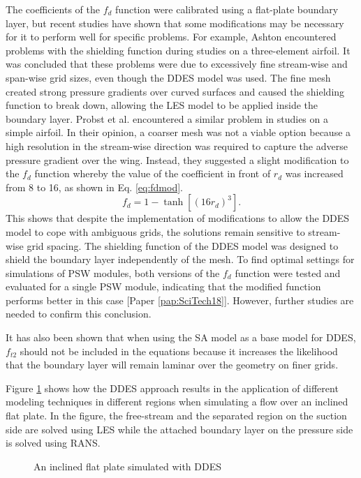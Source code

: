 The coefficients of the $f_d$ function were calibrated using a flat-plate boundary layer, but recent studies have shown that some modifications may be necessary for it to perform well for specific problems. For example, Ashton\cite{Ashton2016} encountered problems with the shielding function during studies on a three-element airfoil. It was concluded that these problems were due to excessively fine stream-wise and span-wise grid sizes, even though the DDES model was used. The fine mesh created strong pressure gradients over curved surfaces and caused the shielding function to break down, allowing the LES model to be applied inside the boundary layer. Probst et al.\cite{Probst2010} encountered a similar problem in studies on a simple airfoil. In their opinion, a coarser mesh was not a viable option because a high resolution in the stream-wise direction was required to capture the adverse pressure gradient over the wing. Instead, they suggested a slight modification to the $f_d$ function whereby the value of the coefficient in front of $r_d$ was increased from 8 to 16, as shown in Eq. \ref{eq:fdmod}. 
\begin{equation}
  f_d = 1-\tanh\left[(16r_d)^3\right].
  \label{eq:fdmod}
\end{equation}
This shows that despite the implementation of modifications to allow the DDES model to cope with ambiguous grids, the solutions remain sensitive to stream-wise grid spacing. The shielding function of  the DDES model was designed to shield the boundary layer independently of the mesh. To find optimal settings for simulations of PSW modules, both versions of the $f_d$ function were tested and evaluated for a single PSW module, indicating that the modified function performs better in this case [Paper \ref{pap:SciTech18}]. However, further studies are needed to confirm this conclusion.

It has also been shown that when using the SA model as a base model for DDES, $f_{t2}$ should not be included in the equations because it increases the likelihood that the boundary layer will remain laminar over the geometry on finer grids\cite{Vatsa2017}.

Figure \ref{fig:FPDDES} shows how the DDES approach results in the application of different modeling techniques in different regions when simulating a flow over an inclined flat plate. In the figure, the free-stream and the separated region on the suction side are solved using LES while the attached boundary layer on the pressure side is solved using RANS.
\begin{figure}[H]
  \centering

  \caption{An inclined flat plate simulated with DDES}\label{fig:FPDDES}
\end{figure}



